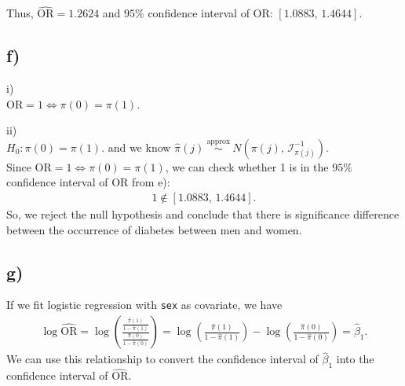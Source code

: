 \documentclass[a4paper]{article}
\begin{document}
Thus, $\widehat{\mathrm{OR}} = 1.2624$ and $95\%$ confidence interval of $\mathrm{OR}$: $[1.0883, \, 1.4644]$.

\vspace{\baselineskip}
\subsection{f)}

i)\\
$\mathrm{OR} = 1 \iff \pi(0) = \pi(1)$.

ii)\\
$H_{0}: \pi(0) = \pi(1)$. and we know $\widehat{\pi}(j) ~\overset{\mathrm{approx}}{\sim}~ N\left(\pi(j), \, \mathcal{I}_{\pi(j)}^{-1}\right)$.\\

Since $\mathrm{OR} = 1 \iff \pi(0) = \pi(1)$, we can check whether 1 is in the $95\%$ confidence interval of OR from e):
\begin{align*}
1 \notin [1.0883, \, 1.4644].
\end{align*}
So, we reject the null hypothesis and conclude that there is significance difference between the occurrence of diabetes between men and women.


\vspace{\baselineskip}
\subsection{g)}
If we fit logistic regression with \texttt{sex} as covariate, we have
\begin{align*}
\log\widehat{\mathrm{OR}} = \log\left(\frac{\frac{\widehat{\pi}(1)}{1-\widehat{\pi}(1)}}{\frac{\widehat{\pi}(0)}{1-\widehat{\pi}(0)}}\right) = \log\left(\frac{\widehat{\pi}(1)}{1-\widehat{\pi}(1)}\right) - \log\left(\frac{\widehat{\pi}(0)}{1-\widehat{\pi}(0)}\right)= \widehat{\beta}_{1}.
\end{align*}
We can use this relationship to convert the confidence interval of $\widehat{\beta}_{1}$ into the confidence interval of $\widehat{\mathrm{OR}}$.
\end{document}
